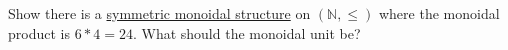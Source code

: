 Show there is a \hyperref[D2.2]{symmetric monoidal structure} on $(\mathbb{N}, \leq)$ where the monoidal product is $6*4=24$. What should the monoidal unit be?